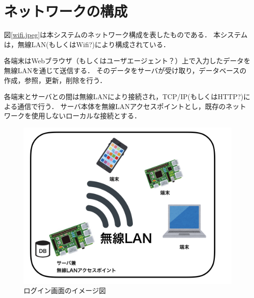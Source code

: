 \section{ネットワークの構成}
図\ref{wifi.jpeg}は本システムのネットワーク構成を表したものである．
本システムは，無線LAN(もしくはWifi?)により構成されている．

各端末はWebブラウザ（もしくはユーザエージェント？）上で入力したデータを無線LANを通じて送信する．
そのデータをサーバが受け取り，データベースの作成，参照，更新，削除を行う．

各端末とサーバとの間は無線LANにより接続され，TCP/IP(もしくはHTTP?)による通信で行う．
サーバ本体を無線LANアクセスポイントとし，既存のネットワークを使用しないローカルな接続とする．

\begin{figure}[htbp]
  \begin{center}
    \includegraphics[width=1\linewidth,clip]{./wifi.jpeg}
    \caption{ログイン画面のイメージ図}\label{fig:wifi.jpeg}
  \end{center}
\end{figure}
